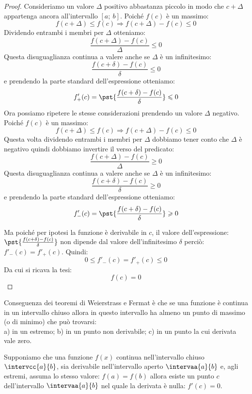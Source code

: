 \vspace{-10mm}                           %
\begin{proof}
Consideriamo un valore \(\Delta\) positivo abbastanza piccolo 
in modo che \(c+\Delta\) appartenga ancora all'intervallo \([a;~b]\).
Poiché \(f(c)\) è un massimo: 
\[f(c+\Delta) \leqslant f(c) \Rightarrow f(c+\Delta) - f(c) \leqslant 0\]
Dividendo entrambi i membri per \(\Delta\) otteniamo:
\[\frac{f(c+\Delta) - f(c)}{\Delta} \leqslant 0\]
Questa disuguaglianza continua a valere anche se \(\Delta\) è un 
infinitesimo:
\[\frac{f(c+\delta) - f(c)}{\delta} \leqslant 0\] 
e prendendo la parte standard dell'espressione otteniamo:
\[f'_+(c)=\pst{\frac{f(c+\delta) - f(c)}{\delta}} \leqslant 0\] 
Ora possiamo ripetere le stesse considerazioni prendendo un valore 
\(\Delta\) 
negativo.
Poiché \(f(c)\) è un massimo: 
\[f(c+\Delta) \leqslant f(c) \Rightarrow f(c+\Delta) - f(c) \leqslant 0\]
Questa volta dividendo entrambi i membri per \(\Delta\) dobbiamo tener 
conto che \(\Delta\) è negativo quindi dobbiamo invertire il verso del 
predicato:
\[\frac{f(c+\Delta) - f(c)}{\Delta} \geqslant 0\]
Questa disuguaglianza continua a valere anche se \(\Delta\) è un 
infinitesimo:
\[\frac{f(c+\delta) - f(c)}{\delta} \geqslant 0\] 
e prendendo la parte standard dell'espressione otteniamo:
\[f'_-(c)=\pst{\frac{f(c+\delta) - f(c)}{\delta}} \geqslant 0\] 

Ma poiché per ipotesi la funzione è derivabile in \(c\), il valore 
dell'espressione: \(\pst{\frac{f(c+\delta) - f(c)}{\delta}}\) non dipende 
dal valore dell'infinitesimo \(\delta\) perciò: \(f'_-(c) = f'_+(c)\). 
Quindi:
\[0 \leqslant f'_-(c) = f'_+(c) \leqslant 0\]
Da cui si ricava la tesi:
\[f(c) = 0\]
\end{proof}

Conseguenza dei teoremi di Weierstrass e Fermat è che se una funzione è 
continua in un intervallo chiuso allora in questo intervallo ha almeno un 
punto di massimo (o di minimo) che può trovarsi:\\
a) in un estremo; \quad b) in un punto non derivabile; \quad
c) in un punto la cui derivata vale zero.\\
\begin{center} \estremo \nonder \derzero \end{center}

\vspace{-15mm}                           %
\begin{teorema}
Supponiamo che una funzione \(f(x)\) continua nell'intervallo chiuso
\(\intervcc{a}{b}\),
sia derivabile nell'intervallo aperto
\(\intervaa{a}{b}\) 
e, agli estremi, assuma lo stesso valore: \(f(a) = f(b)\) allora
esiste un punto \(c\) dell'intervallo \(\intervaa{a}{b}\) nel quale 
la derivata è nulla: \(f'(c)=0\).
\end{teorema}

